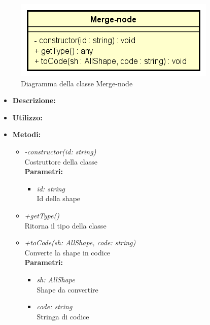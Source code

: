 \begin{figure}[h!]
	\centering
	\includegraphics[scale=0.8]{res/sections/SpecificaFrontEnd/Services/Disegnetti/merge-node.png}
	\caption{Diagramma della classe Merge-node}
\end{figure}

\begin{itemize}
	\item \textbf{Descrizione:}\\
	
	\item \textbf{Utilizzo:}\\
	
	\item \textbf{Metodi:}
		\begin{itemize}
			\item \emph{-constructor(id: string)}\\
    		Costruttore della classe\\
    		\textbf{Parametri:}
    		\begin{itemize}
    			\item \emph{id: string}\\
    			Id della shape
    		\end{itemize}
    		\item \emph{+getType()}\\
    		Ritorna il tipo della classe
    		\item \emph{+toCode(sh: AllShape, code: string)}\\
    		Converte la shape in codice\\
    		\textbf{Parametri:}
    		\begin{itemize}
    			\item \emph{sh: AllShape}\\
    			Shape da convertire
    			\item \emph{code: string}\\
    			Stringa di codice
    		\end{itemize}
    	\end{itemize}
\end{itemize}